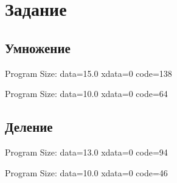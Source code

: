 
\isonefalse
\def \labnum {3}
\def \labsubj {Организация ЭВМ и систем}
\def \labauthor {Айтуганов Д. А. \\ Чебыкин И. Б.}
\def \labgroup {P3301}
\def \labinsp {Скорубский В. И.}
\def \labname {}

\isnametrue
\lstset{
	caption=\lstname,
	basicstyle=\ttfamily\selectfont\scriptsize
}


\section*{Задание}
\subsection*{Умножение}
Program Size: data=15.0 xdata=0 code=138


Program Size: data=10.0 xdata=0 code=64


\subsection*{Деление}
Program Size: data=13.0 xdata=0 code=94


Program Size: data=10.0 xdata=0 code=46


